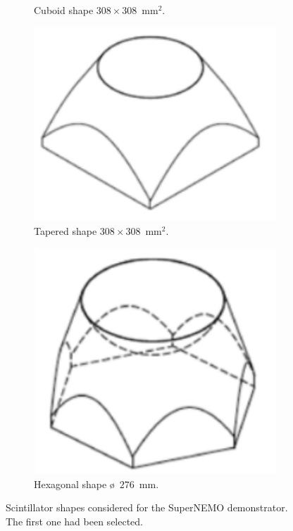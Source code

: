 \begin{figure}[!h]
\begin{subfigure}[t]{0.2\textwidth}
  \captionsetup{justification=centering}
  \caption{Cuboid shape $308\times308$~mm$^{2}$.
    \label{subfig:square_shape}}
\end{subfigure}
\hfill
\begin{subfigure}[t]{0.2\textwidth}
  \centering
  \includegraphics[height=0.8\textwidth]{SNdemonstrator/fig_SNdemonstrator/pyramid_shape.pdf}
  \captionsetup{justification=centering}
  \caption{Tapered shape $308\times308$~mm$^{2}$.
    \label{subfig:square_shape}}
\end{subfigure}
\hfill
\begin{subfigure}[t]{0.2\textwidth}
  \centering
  \includegraphics[height=0.8\textwidth]{SNdemonstrator/fig_SNdemonstrator/bee_shape.pdf}
  \captionsetup{justification=centering}
  \caption{Hexagonal shape \o{}~$276$~mm.
    \label{subfig:square_shape}}
\end{subfigure}
\caption{Scintillator shapes considered for the SuperNEMO demonstrator.
  The first one had been selected.
  \label{fig:scint_shape}}
\end{figure}

